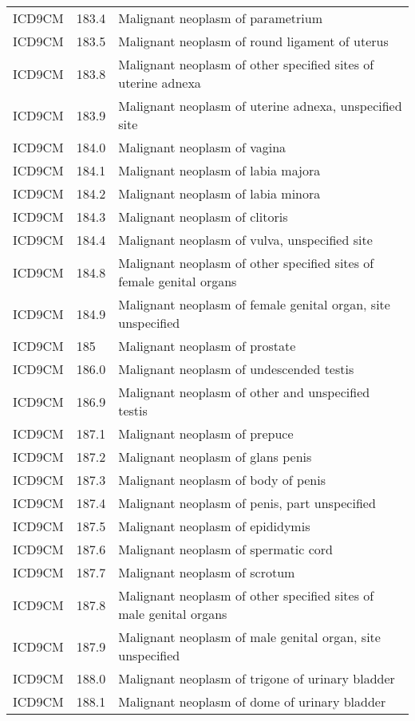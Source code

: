 \begin{longtable}{p{}p{}p{}}
  ICD9CM & 183.4 & Malignant neoplasm of parametrium \\ 
  ICD9CM & 183.5 & Malignant neoplasm of round ligament of uterus \\ 
  ICD9CM & 183.8 & Malignant neoplasm of other specified sites of uterine adnexa \\ 
  ICD9CM & 183.9 & Malignant neoplasm of uterine adnexa, unspecified site \\ 
  ICD9CM & 184.0 & Malignant neoplasm of vagina \\ 
  ICD9CM & 184.1 & Malignant neoplasm of labia majora \\ 
  ICD9CM & 184.2 & Malignant neoplasm of labia minora \\ 
  ICD9CM & 184.3 & Malignant neoplasm of clitoris \\ 
  ICD9CM & 184.4 & Malignant neoplasm of vulva, unspecified site \\ 
  ICD9CM & 184.8 & Malignant neoplasm of other specified sites of female genital organs \\ 
  ICD9CM & 184.9 & Malignant neoplasm of female genital organ, site unspecified \\ 
  ICD9CM & 185 & Malignant neoplasm of prostate \\ 
  ICD9CM & 186.0 & Malignant neoplasm of undescended testis \\ 
  ICD9CM & 186.9 & Malignant neoplasm of other and unspecified testis \\ 
  ICD9CM & 187.1 & Malignant neoplasm of prepuce \\ 
  ICD9CM & 187.2 & Malignant neoplasm of glans penis \\ 
  ICD9CM & 187.3 & Malignant neoplasm of body of penis \\ 
  ICD9CM & 187.4 & Malignant neoplasm of penis, part unspecified \\ 
  ICD9CM & 187.5 & Malignant neoplasm of epididymis \\ 
  ICD9CM & 187.6 & Malignant neoplasm of spermatic cord \\ 
  ICD9CM & 187.7 & Malignant neoplasm of scrotum \\ 
  ICD9CM & 187.8 & Malignant neoplasm of other specified sites of male genital organs \\ 
  ICD9CM & 187.9 & Malignant neoplasm of male genital organ, site unspecified \\ 
  ICD9CM & 188.0 & Malignant neoplasm of trigone of urinary bladder \\ 
  ICD9CM & 188.1 & Malignant neoplasm of dome of urinary bladder \\ 

\end{longtable}
